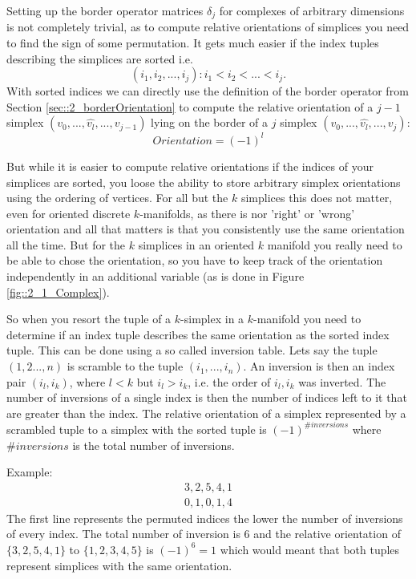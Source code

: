 Setting up the border operator matrices $\delta_j$ for complexes of arbitrary dimensions is not completely trivial, as to compute relative orientations of simplices you need to find the sign of some permutation. It gets much easier if the index tuples describing the simplices are sorted i.e.
\[(i_1,i_2,...,i_j): i_1 < i_2 <...<i_j.\] 
With sorted indices we can directly use the definition of the border operator from Section \ref{sec::2_borderOrientation} to compute the relative orientation of a $j-1$ simplex $(v_0,...,\widehat{v_l},..., v_{j-1})$ lying on the border of a $j$ simplex $(v_0,...,\widehat{v_l},..., v_{j})$:
\[Orientation = (-1)^l\]

But while it is easier to compute relative orientations if the indices of your simplices are sorted, you loose the ability to store arbitrary simplex orientations using the ordering of vertices. For all but the $k$ simplices this does not matter, even for oriented discrete $k$-manifolds, as there is nor 'right' or 'wrong' orientation and all that matters is that you consistently use the same orientation all the time. But for the $k$ simplices in an oriented $k$ manifold you really need to be able to chose the orientation, so you have to keep track of the orientation independently in an additional variable (as is done in Figure \ref{fig::2_1_Complex}).

So when you resort the tuple of a $k$-simplex in a $k$-manifold you need to determine if an index tuple describes the same orientation as the sorted index tuple. This can be done using a so called inversion table. Lets say the tuple $(1,2...,n)$ is scramble to the tuple $(i_1,...,i_n)$. An inversion is then an index pair $(i_l,i_k)$, where $l<k$ but $i_l >i_k$, i.e. the order of $i_l,i_k$ was inverted. The number of inversions of a single index is then the number of indices left to it that are greater than the index. The relative orientation of a simplex represented by a scrambled tuple to a simplex with the sorted tuple is $(-1)^{\#inversions}$ where $\#inversions$ is the total number of inversions.

Example: 
\begin{eqnarray*}
3,2,5,4,1 \\
0,1,0,1,4
\end{eqnarray*}
The first line represents the permuted indices the lower the number of inversions of every index. The total number of inversion is 6 and the relative orientation of
$\{3,2,5,4,1\}$ to $\{1,2,3,4,5\}$ is $(-1)^6 = 1$ which would meant that both tuples represent simplices with the same orientation.

